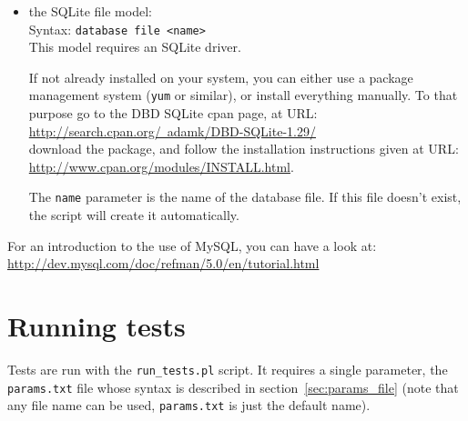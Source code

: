 \documentclass[a4paper,11pt]{article}
\begin{document}
{\begin{itemize}
\item the SQLite file model:  \\
	Syntax: \verb+database file <name>+ \\
	This model requires an SQLite driver.

	If not already installed on your system, you can either use a package management
	system (\verb+yum+ or similar), or install everything manually.
	To that purpose go to the DBD SQLite cpan page, at URL: \\
		\href{http://search.cpan.org/~adamk/DBD-SQLite-1.29/}{http://search.cpan.org/~adamk/DBD-SQLite-1.29/}\\
	download the package, and follow the installation instructions given at URL: \\
		\href{http://www.cpan.org/modules/INSTALL.html}{http://www.cpan.org/modules/INSTALL.html}.

	The \verb+name+ parameter is the name of the database file. If this file doesn't exist,
	the script will create it automatically.

\end{itemize}

For an introduction to the use of MySQL, you can have a look at:\\
\href{http://dev.mysql.com/doc/refman/5.0/en/tutorial.html}{http://dev.mysql.com/doc/refman/5.0/en/tutorial.html}



\section{Running tests}
\label{sec:running_tests}
\begin{flushright}
\end{flushright}

Tests are run with the \verb+run_tests.pl+ script.
It requires a single parameter, the \verb+params.txt+ file whose syntax is described in 
section~\ref{sec:params_file}
(note that any file name can be used, \verb+params.txt+ is just the default name).

}
\end{document}
